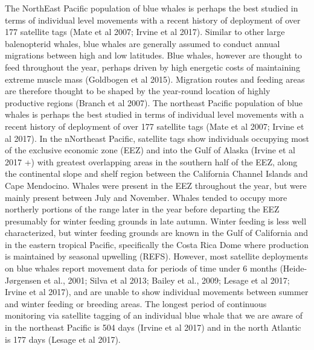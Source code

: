 \documentclass[a4paper,12pt]{article}
\begin{document}
The NorthEast Pacific population of blue whales is perhaps the best studied in terms of individual level movements with a recent history of deployment of over 177 satellite tags (Mate et al 2007; Irvine et al 2017). 
 Similar to other large balenopterid whales, blue whales are generally assumed to conduct annual migrations between high and low latitudes. Blue whales, however are thought to feed throughout the year, perhaps driven by high energetic costs of maintaining extreme muscle mass (Goldbogen et al 2015). Migration routes and feeding areas are therefore thought to be shaped by the year-round location of highly productive regions (Branch et al 2007). The northeast Pacific population of blue whales is perhaps the best studied in terms of individual level movements with a recent history of deployment of over 177 satellite tags (Mate et al 2007; Irvine et al 2017). In the nNortheast Pacific, satellite tags show individuals occupying most of the exclusive economic zone (EEZ) and into the Gulf of Alaska (Irvine et al 2017 +) with greatest overlapping areas in the southern half of the EEZ, along the continental slope and shelf region between the California Channel Islands and Cape Mendocino. Whales were present in the EEZ throughout the year, but were mainly present between July and November. Whales tended to occupy more northerly portions of the range later in the year before departing the EEZ presumably for winter feeding grounds in late autumn. Winter feeding is less well characterized, but winter feeding grounds are known in the Gulf of California and in the eastern tropical Pacific, specifically the Costa Rica Dome  where production is maintained by seasonal upwelling (REFS). However, most satellite deployments on blue whales report movement data for periods of time under 6 months (Heide-Jørgensen et al., 2001; Silva et al 2013; Bailey et al., 2009; Lesage et al 2017; Irvine et al 2017), and are unable to show individual movements between summer and winter feeding or breeding areas. The longest period of continuous monitoring via satellite tagging of an individual blue whale that we are aware of in the northeast Pacific is 504 days (Irvine et al 2017) and in the north Atlantic is 177 days (Lesage et al 2017).
\end{document}
